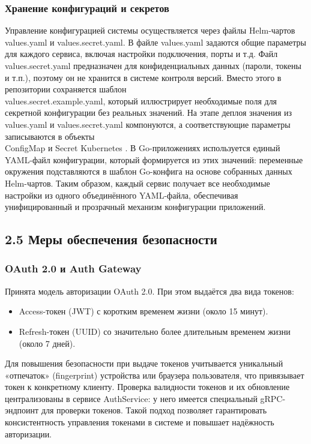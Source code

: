 \subsubsection*{Хранение конфигураций и секретов}
Управление конфигурацией системы осуществляется через файлы Helm-чартов values.yaml и values.secret.yaml. В файле values.yaml задаются общие параметры для каждого сервиса, включая настройки подключения, порты и т.д. Файл values.secret.yaml предназначен для конфиденциальных данных (пароли, токены и т.п.), поэтому он не хранится в системе контроля версий. Вместо этого в репозитории сохраняется шаблон \\ values.secret.example.yaml, который иллюстрирует необходимые поля для секретной конфигурации без реальных значений. На этапе деплоя значения из values.yaml и values.secret.yaml компонуются, а соответствующие параметры записываются в объекты \\ ConfigMap и Secret Kubernetes \cite{3}\cite{4}. В Go-приложениях используется единый YAML-файл конфигурации, который формируется из этих значений: переменные окружения подставляются в шаблон Go-конфига на основе собранных данных Helm-чартов. Таким образом, каждый сервис получает все необходимые настройки из одного объединённого YAML-файла, обеспечивая унифицированный и прозрачный механизм конфигурации приложений.

\subsection*{2.5 Меры обеспечения безопасности}

\subsubsection*{OAuth 2.0 и Auth Gateway}
Принята модель авторизации OAuth 2.0. При этом выдаётся два вида токенов:
\begin{itemize}
    \item Access-токен (JWT) \cite{7} с коротким временем жизни (около 15 минут).
    \item Refresh-токен (UUID) со значительно более длительным временем жизни (около 7 дней).
\end{itemize}
\noindent Для повышения безопасности при выдаче токенов учитывается уникальный «отпечаток» (fingerprint) устройства или браузера пользователя, что привязывает токен к конкретному клиенту. Проверка валидности токенов и их обновление централизованы в сервисе AuthService: у него имеется специальный gRPC-эндпоинт для проверки токенов. Такой подход позволяет гарантировать консистентность управления токенами в системе и повышает надёжность авторизации.


